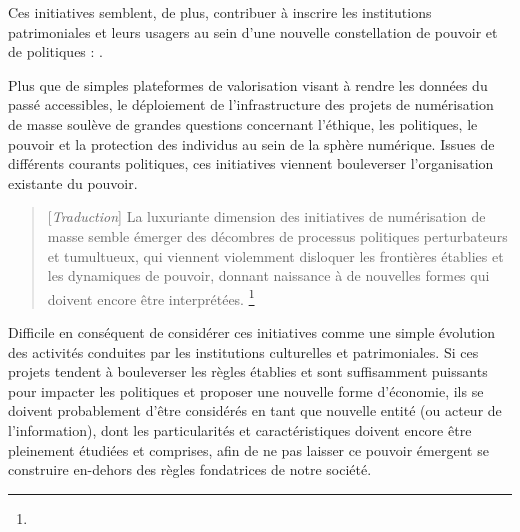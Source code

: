 Ces initiatives semblent, de plus, contribuer à inscrire les institutions patrimoniales et leurs usagers au sein d'une nouvelle constellation de pouvoir et de politiques : .

Plus que de simples plateformes de valorisation visant à rendre les données du passé accessibles, le déploiement de l'infrastructure des projets de numérisation de masse soulève de grandes questions concernant l'éthique, les politiques, le pouvoir et la protection des individus au sein de la sphère numérique. Issues de différents courants politiques, ces initiatives viennent bouleverser l'organisation existante du pouvoir.
\begin{quotation}
[\textit{Traduction}]
La luxuriante dimension des initiatives de numérisation de masse semble émerger des décombres de processus politiques perturbateurs et tumultueux, qui viennent violemment disloquer les frontières établies et les dynamiques de pouvoir, donnant naissance à de nouvelles formes qui doivent encore être interprétées. \footnote{} 
\end{quotation}

Difficile en conséquent de considérer ces initiatives comme une simple évolution des activités conduites par les institutions culturelles et patrimoniales. Si ces projets tendent à bouleverser les règles établies et sont suffisamment puissants pour impacter les politiques et proposer une nouvelle forme d'économie, ils se doivent probablement d'être considérés en tant que nouvelle entité (ou acteur de l'information), dont les particularités et caractéristiques doivent encore être pleinement étudiées et comprises, afin de ne pas laisser ce pouvoir émergent se construire en-dehors des règles fondatrices de notre société.


